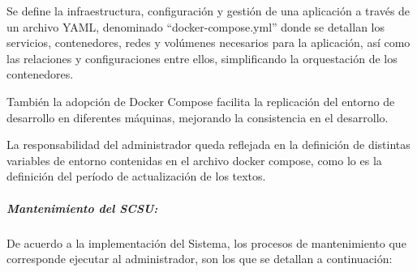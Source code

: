 \documentclass[
  12pt,
  openany]{book}
\begin{document}
Se define la infraestructura, configuración y gestión de una aplicación a través de un archivo YAML, denominado ``docker-compose.yml'' donde se detallan los servicios, contenedores, redes y volúmenes necesarios para la aplicación, así como las relaciones y configuraciones entre ellos, simplificando la orquestación de los contenedores.

También la adopción de Docker Compose facilita la replicación del entorno de desarrollo en diferentes máquinas, mejorando la consistencia en el desarrollo.

La responsabilidad del administrador queda reflejada en la definición de distintas variables de entorno contenidas en el archivo docker compose, como lo es la definición del período de actualización de los textos.

\hypertarget{mantenimiento-del-scsu}{%
\subparagraph{Mantenimiento del SCSU:}\label{mantenimiento-del-scsu}}

De acuerdo a la implementación del Sistema, los procesos de mantenimiento que corresponde ejecutar al administrador, son los que se detallan a continuación:
\end{document}
